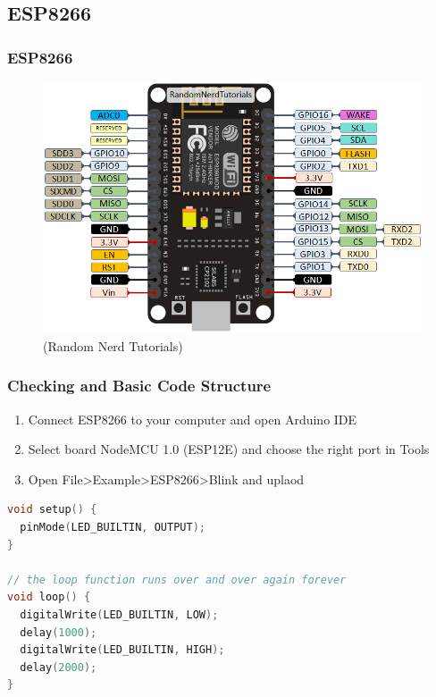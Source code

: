 \documentclass[compress, aspectratio=32]{beamer}
\begin{document}
\subsection{ESP8266}
\begin{frame}
    \frametitle{ESP8266}
    \begin{figure}
        \centering
        \includegraphics[height=0.7\textheight]{ESP8266-NodeMCU-kit-12-E-pinout-gpio-pin.png}
        \caption*{(Random Nerd Tutorials)}
    \end{figure}
\end{frame}
\begin{frame}[fragile]
    \frametitle{Checking and Basic Code Structure}
    \begin{enumerate}
        \item Connect ESP8266 to your computer and open Arduino IDE
        \item Select board NodeMCU 1.0 (ESP12E) and choose the right port in Tools
        \item Open File>Example>ESP8266>Blink and uplaod
    \end{enumerate}
    \begin{lstlisting}[language=c]
void setup() {
  pinMode(LED_BUILTIN, OUTPUT);  
}

// the loop function runs over and over again forever
void loop() {
  digitalWrite(LED_BUILTIN, LOW);  
  delay(1000);                      
  digitalWrite(LED_BUILTIN, HIGH);  
  delay(2000);   
}                   
    \end{lstlisting}
    
\end{frame}
\end{document}
